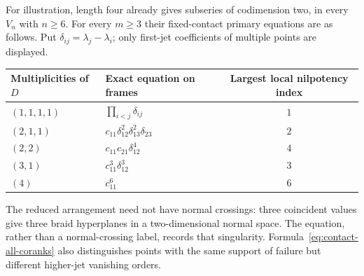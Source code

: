 For illustration, length four already gives subseries of codimension
two, in every $V_n$ with $n\ge6$. For every $m\ge3$ their fixed-contact
primary equations are as follows. Put $\delta_{ij}=\lambda_j-\lambda_i$;
only first-jet coefficients of multiple points are displayed.
\begin{center}
\begin{tabular}{@{}llc@{}}
\toprule
Multiplicities of $D$ & Exact equation on frames & Largest local nilpotency index\\
\midrule
$(1,1,1,1)$ & $\prod_{i<j}\delta_{ij}$ & $1$\\
$(2,1,1)$ & $c_{11}\delta_{12}^2\delta_{13}^2\delta_{23}$ & $2$\\
$(2,2)$ & $c_{11}c_{21}\delta_{12}^4$ & $4$\\
$(3,1)$ & $c_{11}^3\delta_{12}^3$ & $3$\\
$(4)$ & $c_{11}^6$ & $6$\\
\bottomrule
\end{tabular}
\end{center}
The reduced arrangement need not have normal crossings: three
coincident values give three braid hyperplanes in a two-dimensional
normal space. The equation, rather than a normal-crossing label,
records that singularity. Formula~\eqref{eq:contact-all-coranks}
also distinguishes points with the same support of failure but
different higher-jet vanishing orders.

